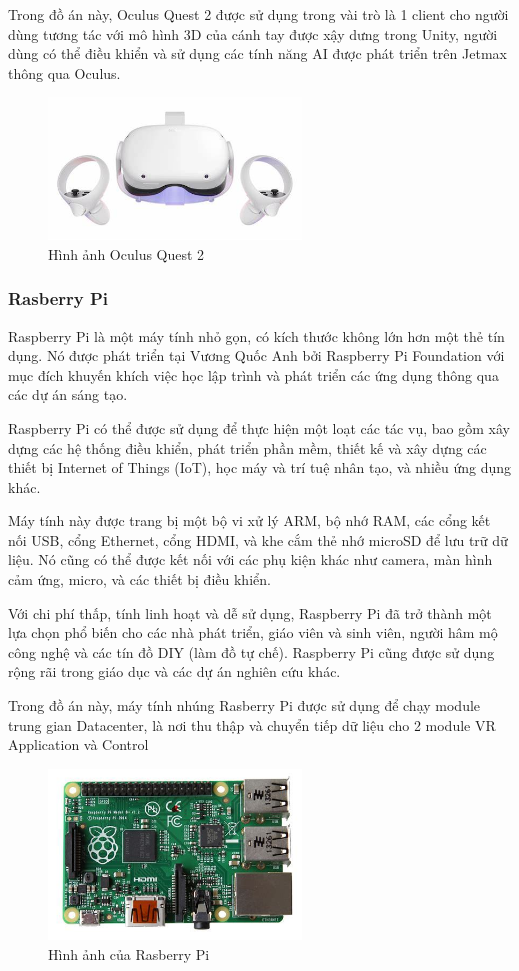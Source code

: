 Trong đồ án này, Oculus Quest 2 được sử dụng trong vài trò là 1 client cho người dùng tương tác với mô hình 3D của cánh tay được xậy dưng trong Unity, người dùng có thể điều khiển và sử dụng các tính năng AI được phát triển trên Jetmax thông qua Oculus.
\begin{figure}[!h]
    \centering
    \includegraphics[width=0.6\textwidth]{Images/Implementation/VRapp/Oculus.jpg}
    \caption{Hình ảnh Oculus Quest 2}
    \label{fig:comp_mqtt}
\end{figure}
\subsubsection{Rasberry Pi}
Raspberry Pi là một máy tính nhỏ gọn, có kích thước không lớn hơn một thẻ tín dụng. Nó được phát triển tại Vương Quốc Anh bởi Raspberry Pi Foundation với mục đích khuyến khích việc học lập trình và phát triển các ứng dụng thông qua các dự án sáng tạo.

Raspberry Pi có thể được sử dụng để thực hiện một loạt các tác vụ, bao gồm xây dựng các hệ thống điều khiển, phát triển phần mềm, thiết kế và xây dựng các thiết bị Internet of Things (IoT), học máy và trí tuệ nhân tạo, và nhiều ứng dụng khác.

Máy tính này được trang bị một bộ vi xử lý ARM, bộ nhớ RAM, các cổng kết nối USB, cổng Ethernet, cổng HDMI, và khe cắm thẻ nhớ microSD để lưu trữ dữ liệu. Nó cũng có thể được kết nối với các phụ kiện khác như camera, màn hình cảm ứng, micro, và các thiết bị điều khiển.

Với chi phí thấp, tính linh hoạt và dễ sử dụng, Raspberry Pi đã trở thành một lựa chọn phổ biến cho các nhà phát triển, giáo viên và sinh viên, người hâm mộ công nghệ và các tín đồ DIY (làm đồ tự chế). Raspberry Pi cũng được sử dụng rộng rãi trong giáo dục và các dự án nghiên cứu khác.

Trong đồ án này, máy tính nhúng Rasberry Pi được sử dụng để chạy module trung gian Datacenter, là nơi thu thập và chuyển tiếp dữ liệu cho 2 module VR Application và Control
\begin{figure}[!h]
    \centering
    \includegraphics[width=0.6\textwidth]{Images/Implementation/Datacenter/Ras.jpg}
    \caption{Hình ảnh của Rasberry Pi}
\end{figure}
